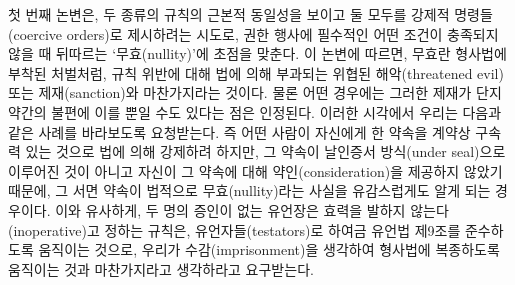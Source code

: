 첫 번째 논변은, 두 종류의 규칙의 근본적 동일성을 보이고 둘 모두를 강제적
명령들(coercive orders)로 제시하려는 시도로, 권한 행사에 필수적인 어떤
조건이 충족되지 않을 때 뒤따르는 ‘무효(nullity)’에 초점을 맞춘다. 이
논변에 따르면, 무효란 형사법에 부착된 처벌처럼, 규칙 위반에 대해 법에
의해 부과되는 위협된 해악(threatened evil) 또는 제재(sanction)와
마찬가지라는 것이다. 물론 어떤 경우에는 그러한 제재가 단지 약간의 불편에
이를 뿐일 수도 있다는 점은 인정된다. 이러한 시각에서 우리는 다음과 같은
사례를 바라보도록 요청받는다. 즉 어떤 사람이 자신에게 한 약속을 계약상
구속력 있는 것으로 법에 의해 강제하려 하지만, 그 약속이 날인증서
방식(under seal)으로 이루어진 것이 아니고 자신이 그 약속에 대해
약인(consideration)을 제공하지 않았기 때문에, 그 서면 약속이 법적으로
무효(nullity)라는 사실을 유감스럽게도 알게 되는 경우이다. 이와 유사하게,
두 명의 증인이 없는 유언장은 효력을 발하지 않는다(inoperative)고 정하는
규칙은, 유언자들(testators)로 하여금 유언법 제9조를 준수하도록 움직이는
것으로, 우리가 수감(imprisonment)을 생각하여 형사법에 복종하도록
움직이는 것과 마찬가지라고 생각하라고 요구받는다.

